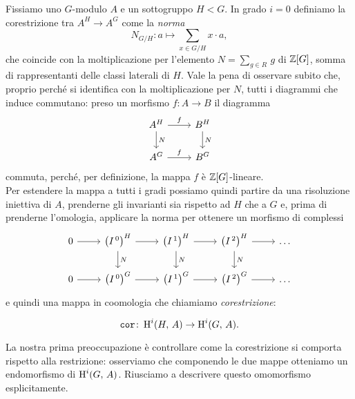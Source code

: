 \begin{definition}[Corestrizione]
Fissiamo uno $ G $-modulo $ A $ e un sottogruppo $ H < G $. In grado $ i = 0 $ definiamo la corestrizione tra $ A^H \to A^G $  come la \emph{norma}
\[N_{G/H} \colon a \mapsto \sum_{x \in G/H} x \cdot a, \]
che coincide con la moltiplicazione per l'elemento $ N = \sum_{g \in R} \, g $ di $ \mathbb{Z}[G] $, somma di rappresentanti delle classi laterali di $ H $. Vale la pena di osservare subito che, proprio perché si identifica con la moltiplicazione per $ N $, tutti i diagrammi che induce commutano: preso un morfismo $ f \colon A \to B $ il diagramma
\[\begin{tikzcd}
A^H \rar["f"] \dar{N} 
& B^H \arrow[d, "N"]\\
A^G \rar["f"]
& B^G
\end{tikzcd}\] 
commuta, perché, per definizione, la mappa $ f $ è $ \mathbb{Z}[G] $-lineare. \\

Per estendere la mappa a tutti i gradi possiamo quindi partire da una risoluzione iniettiva di $ A $, prenderne gli invarianti sia rispetto ad $ H $ che a $ G $ e, prima di prenderne l'omologia, applicare la norma per ottenere un morfismo di complessi
\[\begin{tikzcd}
0 \rar
& \left(I^{\,0}\right)^H \rar \dar["N"]
& \left(I^{\,1}\right)^H \rar \dar["N"]
& \left(I^{\,2}\right)^H \rar \dar["N"]
& \dots \\
0 \rar
& \left(I^{\,0}\right)^{G} \rar
& \left(I^{\,1}\right)^{G} \rar
& \left(I^{\,2}\right)^{G} \rar
& \dots
\end{tikzcd} \]
e quindi una mappa in coomologia che chiamiamo \emph{corestrizione}:

\[ \operatorname{\mathtt{cor}} \colon \operatorname{H}^i(H, \, A) \to \operatorname{H}^i(G, \, A). \]

\end{definition}

La nostra prima preoccupazione è controllare come la corestrizione si comporta rispetto alla restrizione: osserviamo che componendo le due mappe otteniamo un endomorfismo di $ \operatorname{H}^i(G, \, A) $. Riusciamo a descrivere questo omomorfismo esplicitamente.

